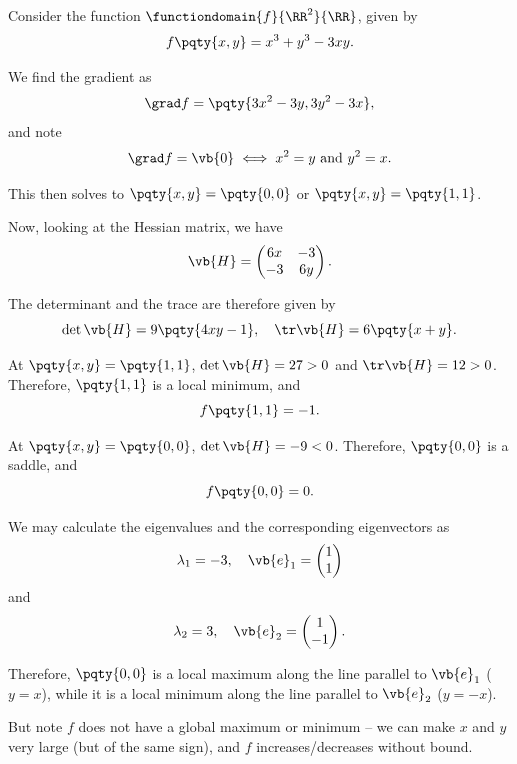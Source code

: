 \begin{example}
    \label{ex:finding-classifying-stationary-points}%
    Consider the function \(\functiondomain{f}{\RR^2}{\RR}\), given by
    \[
        f\pqty{x, y} = x^3 + y^3 - 3xy.
    \]

    We find the gradient as
    \[
        \grad f = \pqty{3 x^2 - 3y, 3 y^2 - 3x},
    \]
    and note
    \[
        \grad f = \vb{0} \iff x^2 = y \text{ and } y^2 = x.
    \]

    This then solves to \(\pqty{x, y} = \pqty{0, 0}\) or \(\pqty{x, y} = \pqty{1, 1}\).

    Now, looking at the Hessian matrix, we have
    \[
        \vb{H} = \begin{pmatrix}
            6x & -3 \\ -3 & 6y
        \end{pmatrix}.
    \]

    The determinant and the trace are therefore given by
    \[
        \det \vb{H} = 9 \pqty{4xy - 1}, \quad \tr \vb{H} = 6 \pqty{x + y}.
    \]

    At \(\pqty{x, y} = \pqty{1, 1}\), \(\det \vb{H} = 27 > 0\) and \(\tr \vb{H} = 12 > 0\). Therefore, \(\pqty{1, 1}\) is a local minimum, and
    \[
        f\pqty{1, 1} = -1.
    \]

    At \(\pqty{x, y} = \pqty{0, 0}\), \(\det \vb{H} = -9 < 0\). Therefore, \(\pqty{0, 0}\) is a saddle, and
    \[
        f\pqty{0, 0} = 0.
    \]

    We may calculate the eigenvalues and the corresponding eigenvectors as
    \[
        \lambda_1 = -3, \quad \vb{e}_1 = \begin{pmatrix}
            1 \\ 1
        \end{pmatrix}
    \]
    and
    \[
        \lambda_2 = 3, \quad \vb{e}_2 = \begin{pmatrix}
            1 \\ -1
        \end{pmatrix}.
    \]

    Therefore, \(\pqty{0, 0}\) is a local maximum along the line parallel to \(\vb{e}_1\) (\(y = x\)), while it is a local minimum along the line parallel to \(\vb{e}_2\) (\(y = -x\)).

    But note \(f\) does not have a global maximum or minimum -- we can make \(x\) and \(y\) very large (but of the same sign), and \(f\) increases/decreases without bound.
\end{example}